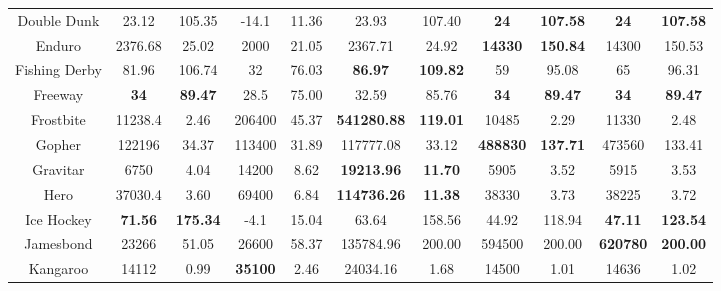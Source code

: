 \documentclass[nohyperref]{article}
\newcommand{\best}[1]{\textbf{#1}}
\theoremstyle{plain}
\begin{document}
\begin{table}[!hb]
\begin{center}
\begin{tabular}{ |c| c c| c c| c c| c c| c c| }
 Double Dunk        & 23.12             & 105.35            & -14.1           & 11.36          & 23.93                &107.40                    &\textbf{24}       &\textbf{107.58}    &\textbf{24}&\textbf{107.58}     \\
 Enduro             & 2376.68           & 25.02             & 2000            & 21.05          & 2367.71              &24.92                     &\best{14330}      &\textbf{150.84}    &14300     &150.53          \\
 Fishing Derby      & 81.96             & 106.74            & 32              & 76.03          & \textbf{86.97}       &\textbf{109.82}           &59                &95.08   &65        &96.31           \\
 Freeway            & \textbf{34}       & \textbf{89.47}    & 28.5            & 75.00          & 32.59                &85.76                     &\best{34}         &\textbf{89.47}     &\textbf{34} &\textbf{89.47}           \\
 Frostbite          & 11238.4           & 2.46              & 206400          & 45.37          &\textbf{541280.88}    &\textbf{119.01}           &10485             &2.29               &11330     &2.48            \\
 Gopher             & 122196            & 34.37             & 113400          & 31.89          & 117777.08            &33.12                     &\best{488830}     &\textbf{137.71}    &473560    &133.41          \\
 Gravitar           & 6750              & 4.04              & 14200           & 8.62           &\textbf{19213.96}     &\textbf{11.70}            &5905              &3.52               &5915      &3.53    \\
 Hero               & 37030.4           & 3.60              & 69400           & 6.84           &\textbf{114736.26}    &\textbf{11.38}            &38330             &3.73               &38225     &3.72    \\
 Ice Hockey         & \textbf{71.56}    & \textbf{175.34}   &-4.1             & 15.04          & 63.64                &158.56                    &44.92             &118.94             &\textbf{47.11}  &\textbf{123.54}\\
 Jamesbond          & 23266             & 51.05             & 26600           & 58.37          & 135784.96            &200.00                    &594500            &200.00             &\textbf{620780} &\textbf{200.00}   \\
 Kangaroo           & 14112             & 0.99              & \textbf{35100}  & 2.46           &24034.16              &1.68                      &14500             &1.01               &14636           &1.02\\

\end{tabular}
\end{center}
\end{table}
\end{document}
